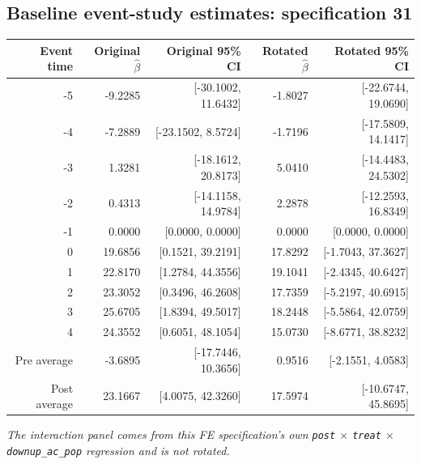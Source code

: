 \documentclass[10pt]{article}
\begin{document}
\subsection*{Baseline event-study estimates: specification 31}
\begin{center}
\scriptsize
\begin{tabular}{r rr rr}
\toprule
Event time & Original $\hat\beta$ & Original 95\% CI & Rotated $\hat\beta$ & Rotated 95\% CI \\
\midrule
-5 & -9.2285 & [-30.1002, 11.6432] & -1.8027 & [-22.6744, 19.0690] \\
-4 & -7.2889 & [-23.1502, 8.5724] & -1.7196 & [-17.5809, 14.1417] \\
-3 & 1.3281 & [-18.1612, 20.8173] & 5.0410 & [-14.4483, 24.5302] \\
-2 & 0.4313 & [-14.1158, 14.9784] & 2.2878 & [-12.2593, 16.8349] \\
-1 & 0.0000 & [0.0000, 0.0000] & 0.0000 & [0.0000, 0.0000] \\
0 & 19.6856 & [0.1521, 39.2191] & 17.8292 & [-1.7043, 37.3627] \\
1 & 22.8170 & [1.2784, 44.3556] & 19.1041 & [-2.4345, 40.6427] \\
2 & 23.3052 & [0.3496, 46.2608] & 17.7359 & [-5.2197, 40.6915] \\
3 & 25.6705 & [1.8394, 49.5017] & 18.2448 & [-5.5864, 42.0759] \\
4 & 24.3552 & [0.6051, 48.1054] & 15.0730 & [-8.6771, 38.8232] \\
\midrule
Pre average & -3.6895 & [-17.7446, 10.3656] & 0.9516 & [-2.1551, 4.0583] \\
Post average & 23.1667 & [4.0075, 42.3260] & 17.5974 & [-10.6747, 45.8695] \\
\bottomrule
\end{tabular}
\end{center}
\medskip
\textit{The interaction panel comes from this FE specification's own \texttt{post} $\times$ \texttt{treat} $\times$ \texttt{downup\_ac\_pop} regression and is not rotated.}
\clearpage
\end{document}

